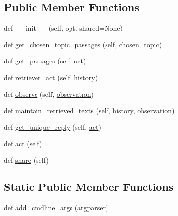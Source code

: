 \subsection*{Public Member Functions}
\begin{DoxyCompactItemize}
\item 
def \hyperlink{classinteractive__retrieval_1_1InteractiveRetrievalAgent_a9824f3d5f8f195c1c7a713d5eea52041}{\+\_\+\+\_\+init\+\_\+\+\_\+} (self, \hyperlink{classinteractive__retrieval_1_1InteractiveRetrievalAgent_a223bbe2d336caaeec4a45acb1e9f6ecd}{opt}, shared=None)
\item 
def \hyperlink{classinteractive__retrieval_1_1InteractiveRetrievalAgent_a89ffcbffdda3d20c82ef7ee65ab63461}{get\+\_\+chosen\+\_\+topic\+\_\+passages} (self, chosen\+\_\+topic)
\item 
def \hyperlink{classinteractive__retrieval_1_1InteractiveRetrievalAgent_acee2bc62b6109f28c06b82efb816eee3}{get\+\_\+passages} (self, \hyperlink{classinteractive__retrieval_1_1InteractiveRetrievalAgent_ad350c65cd9fc9393902f61cd77f1cc52}{act})
\item 
def \hyperlink{classinteractive__retrieval_1_1InteractiveRetrievalAgent_a07ae26123c56441549800bd116a86626}{retriever\+\_\+act} (self, history)
\item 
def \hyperlink{classinteractive__retrieval_1_1InteractiveRetrievalAgent_ac8b7ac5b6dbc150f066995b25368d9bd}{observe} (self, \hyperlink{classinteractive__retrieval_1_1InteractiveRetrievalAgent_af1452e6e3b61f2a081548d7b939df7a7}{observation})
\item 
def \hyperlink{classinteractive__retrieval_1_1InteractiveRetrievalAgent_ae3894ebf2b1bb0695eba66d9b1a0f13f}{maintain\+\_\+retrieved\+\_\+texts} (self, history, \hyperlink{classinteractive__retrieval_1_1InteractiveRetrievalAgent_af1452e6e3b61f2a081548d7b939df7a7}{observation})
\item 
def \hyperlink{classinteractive__retrieval_1_1InteractiveRetrievalAgent_a83b0e3a253116e5ce23a4a9388cbc672}{get\+\_\+unique\+\_\+reply} (self, \hyperlink{classinteractive__retrieval_1_1InteractiveRetrievalAgent_ad350c65cd9fc9393902f61cd77f1cc52}{act})
\item 
def \hyperlink{classinteractive__retrieval_1_1InteractiveRetrievalAgent_ad350c65cd9fc9393902f61cd77f1cc52}{act} (self)
\item 
def \hyperlink{classinteractive__retrieval_1_1InteractiveRetrievalAgent_a36cc026e093f92e322b5a8c42cad556a}{share} (self)
\end{DoxyCompactItemize}
\subsection*{Static Public Member Functions}
\begin{DoxyCompactItemize}
\item 
def \hyperlink{classinteractive__retrieval_1_1InteractiveRetrievalAgent_aee00317227b637f9ef4240369575f7ac}{add\+\_\+cmdline\+\_\+args} (argparser)
\end{DoxyCompactItemize}
